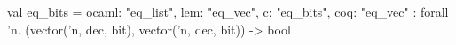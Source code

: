 val eq_bits = {
  ocaml: "eq_list",
  lem: "eq_vec",
  c: "eq_bits",
  coq: "eq_vec"
} : forall 'n. (vector('n, dec, bit), vector('n, dec, bit)) -> bool
